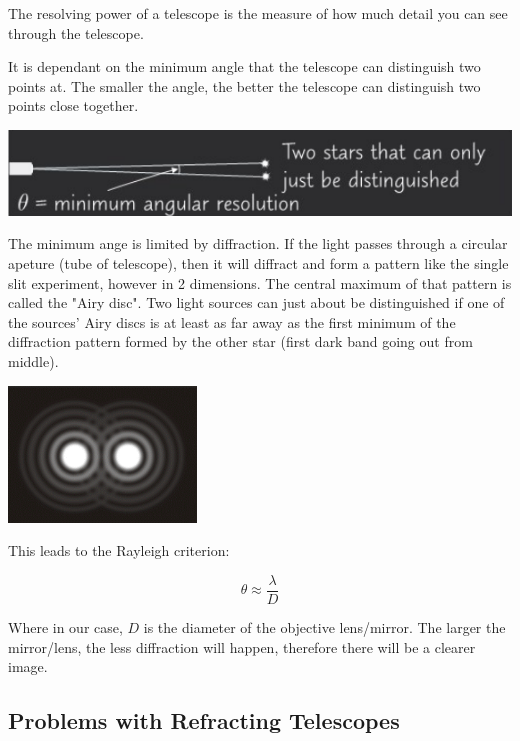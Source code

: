 \documentclass[a4paper, 12pt]{article}
\begin{document}
The resolving power of a telescope is the measure of how much detail you can see through the telescope.

It is dependant on the minimum angle that the telescope can distinguish two points at. The smaller the angle, the better the telescope can distinguish two points close together.

\includegraphics[width=\textwidth]{images/angularResolution.png}

The minimum ange is limited by diffraction. If the light passes through a circular apeture (tube of telescope), then it will diffract and form a pattern like the single slit experiment, however in 2 dimensions. The central maximum of that pattern is called the "Airy disc". Two light sources can just about be distinguished if one of the sources' Airy discs is at least as far away as the first minimum of the diffraction pattern formed by the other star (first dark band going out from middle).

\begin{center}
\includegraphics[width=5cm]{images/airyDisc.png}
\end{center}

This leads to the Rayleigh criterion:

$$
\theta \approx \frac{\lambda}{D}
$$

Where in our case, $D$ is the diameter of the objective lens/mirror. The larger the mirror/lens, the less diffraction will happen, therefore there will be a clearer image.

\subsection{Problems with Refracting Telescopes}
\end{document}
